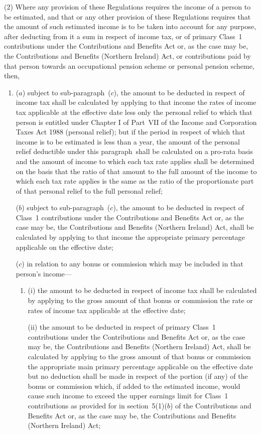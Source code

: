 \documentclass[12pt,a4paper]{article}
\begin{document}
(2) Where any provision of these Regulations requires the income of a person to be estimated, and that or any other provision of these Regulations requires that the amount of such estimated income is to be taken into account for any purpose, after deducting from it a sum in respect of income tax, or of primary Class~1 contributions under the Contributions and Benefits Act or, as the case may be, the Contributions and Benefits (Northern Ireland) Act, or contributions paid by that person towards an occupational pension scheme or personal pension scheme, then,
\begin{enumerate}\item[]
($a$) subject to sub-paragraph~($c$), the amount to be deducted in respect of income tax shall be calculated by applying to that income the rates of income tax applicable at the effective date less only the personal relief to which that person is entitled under Chapter I of Part~VII of the Income and Corporation Taxes Act 1988 (personal relief); but if the period in respect of which that income is to be estimated is less than a year, the amount of the personal relief deductible under this paragraph~shall be calculated on a pro-rata basis and the amount of income to which each tax rate applies shall be determined on the basis that the ratio of that amount to the full amount of the income to which each tax rate applies is the same as the ratio of the proportionate part of that personal relief to the full personal relief;

($b$) subject to sub-paragraph~($c$), the amount to be deducted in respect of Class~1 contributions under the Contributions and Benefits Act or, as the case may be, the Contributions and Benefits (Northern Ireland) Act, shall be calculated by applying to that income the appropriate primary percentage applicable on the effective date;

($c$) in relation to any bonus or commission which may be included in that person’s income—
\begin{enumerate}\item[]
(i) the amount to be deducted in respect of income tax shall be calculated by applying to the gross amount of that bonus or commission the rate or rates of income tax applicable at the effective date;

(ii) the amount to be deducted in respect of primary Class~1 contributions under the Contributions and Benefits Act or, as the case may be, the Contributions and Benefits (Northern Ireland) Act, shall be calculated by applying to the gross amount of that bonus or commission the appropriate main primary percentage applicable on the effective date but no deduction shall be made in respect of the portion (if any) of the bonus or commission which, if added to the estimated income, would cause such income to exceed the upper earnings limit for Class~1 contributions as provided for in section~5(1)($b$)  of the Contributions and Benefits Act or, as the case may be, the Contributions and Benefits (Northern Ireland) Act;
\end{enumerate}


\end{enumerate}
\end{document}
